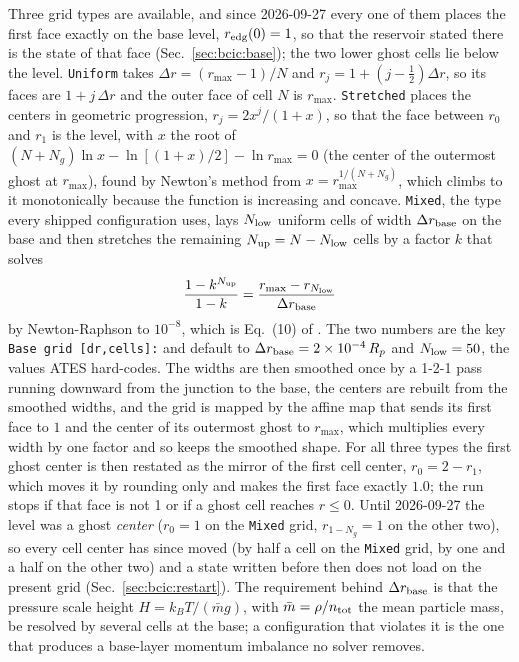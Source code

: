 Three grid types are available, and since 2026-09-27 every one of them
places the first face exactly on the base level, $r_{\rm edg}(0) = 1$, so
that the reservoir stated there is the state of that face
(Sec.~\ref{sec:bcic:base}); the two lower ghost cells lie below the level.
\texttt{Uniform} takes $\Delta r = (r_{\max}-1)/N$ and
$r_j = 1 + (j - \tfrac12)\Delta r$, so its faces are $1 + j\,\Delta r$ and the
outer face of cell $N$ is $r_{\max}$.  \texttt{Stretched} places the centers
in geometric progression, $r_j = 2x^j/(1+x)$, so that the face between
$r_0$ and $r_1$ is the level, with $x$ the root of
$(N+N_g)\ln x - \ln[(1+x)/2] - \ln r_{\max} = 0$ (the center of the outermost
ghost at $r_{\max}$), found by Newton's method from
$x = r_{\max}^{1/(N+N_g)}$, which climbs to it monotonically because the
function is increasing and concave.  \texttt{Mixed}, the type every
shipped configuration uses, lays $N_{\rm low}$ uniform cells of width
$\Delta r_{\rm base}$ on the base and then stretches the remaining
$N_{\rm up} = N - N_{\rm low}$ cells by a factor $k$ that solves
%
\begin{equation}
  \frac{1 - k^{N_{\rm up}}}{1-k}
  = \frac{r_{\max} - r_{N_{\rm low}}}{\Delta r_{\rm base}}
  \label{eq:stretch}
\end{equation}
%
by Newton-Raphson to $10^{-8}$, which is Eq.~(10) of \citet{Caldiroli2021}.
The two numbers are the key \texttt{Base grid [dr,cells]:} and default to
$\Delta r_{\rm base} = 2\times10^{-4}\,R_p$ and $N_{\rm low} = 50$, the values
ATES hard-codes.  The widths are then smoothed once by a 1-2-1 pass running
downward from the junction to the base, the centers are rebuilt from the
smoothed widths, and the grid is mapped by the affine map that sends its
first face to $1$ and the center of its outermost ghost to $r_{\max}$, which
multiplies every width by one factor and so keeps the smoothed shape.  For
all three types the first ghost center is then restated as the mirror of the
first cell center, $r_0 = 2 - r_1$, which moves it by rounding only and makes
the first face exactly $1.0$; the run stops if that face is not 1 or if a
ghost cell reaches $r \le 0$.  Until 2026-09-27 the level was a ghost
\emph{center} ($r_0 = 1$ on the \texttt{Mixed} grid, $r_{1-N_g} = 1$ on the
other two), so every cell center has since moved (by half a cell on the
\texttt{Mixed} grid, by one and a half on the other two) and a state
written before then does not load on the present grid
(Sec.~\ref{sec:bcic:restart}).
The requirement behind $\Delta r_{\rm base}$ is that the pressure scale
height $H = k_BT/(\bar m g)$, with $\bar m = \rho/n_{\rm tot}$ the mean
particle mass, be resolved by several cells at the base; a
configuration that violates it is the one that produces a base-layer momentum
imbalance no solver removes.

